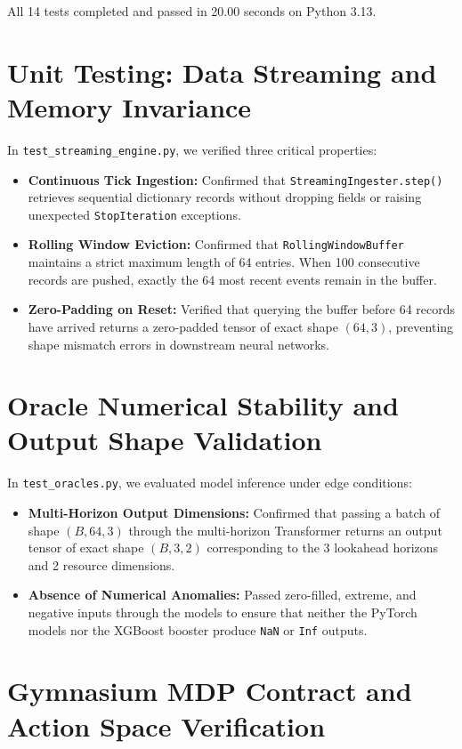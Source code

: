 \documentclass[12pt]{report}
\begin{document}
All 14 tests completed and passed in 20.00 seconds on Python 3.13.

\section{Unit Testing: Data Streaming and Memory Invariance}

In \texttt{test\_streaming\_engine.\allowbreak py}, we verified three critical properties:
\begin{itemize}
\item \textbf{Continuous Tick Ingestion:} Confirmed that \texttt{Streaming\-Ingester.\allowbreak step()} retrieves sequential dictionary records without dropping fields or raising unexpected \texttt{StopIteration} exceptions.
\item \textbf{Rolling Window Eviction:} Confirmed that \texttt{RollingWindowBuffer} maintains a strict maximum length of 64 entries. When 100 consecutive records are pushed, exactly the 64 most recent events remain in the buffer.
\item \textbf{Zero-Padding on Reset:} Verified that querying the buffer before 64 records have arrived returns a zero-padded tensor of exact shape $(64, 3)$, preventing shape mismatch errors in downstream neural networks.
\end{itemize}

\section{Oracle Numerical Stability and Output Shape Validation}

In \texttt{test\_oracles.\allowbreak py}, we evaluated model inference under edge conditions:
\begin{itemize}
\item \textbf{Multi-Horizon Output Dimensions:} Confirmed that passing a batch of shape $(B, 64, 3)$ through the multi-horizon Transformer returns an output tensor of exact shape $(B, 3, 2)$ corresponding to the 3 lookahead horizons and 2 resource dimensions.
\item \textbf{Absence of Numerical Anomalies:} Passed zero-filled, extreme, and negative inputs through the models to ensure that neither the PyTorch models nor the XGBoost booster produce \texttt{NaN} or \texttt{Inf} outputs.
\end{itemize}

\section{Gymnasium MDP Contract and Action Space Verification}
\end{document}
